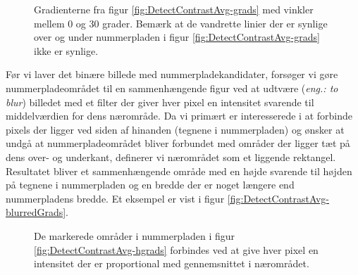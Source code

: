 \begin{figure}[htp]
  \centering
  \caption{Gradienterne fra figur \vref{fig:DetectContrastAvg-grads} med vinkler mellem 0 og 30 grader. Bemærk at de vandrette linier der er synlige over og under nummerpladen i figur \ref{fig:DetectContrastAvg-grads} ikke er synlige.}
  \label{fig:DetectContrastAvg-hgrads}  
\end{figure}


Før vi laver det binære billede med nummerpladekandidater, forsøger vi gøre nummerpladeområdet til en sammenhængende figur ved at udtvære (\textit{eng.: to blur}) billedet med et filter der giver hver pixel en intensitet svarende til middelværdien for dens nærområde. Da vi primært er interesserede i at forbinde pixels der ligger ved siden af hinanden (tegnene i nummerpladen) og ønsker at undgå at nummerpladeområdet bliver forbundet med områder der ligger tæt på dens over- og underkant, definerer vi nærområdet som et liggende rektangel. Resultatet bliver et sammenhængende område med en højde svarende til højden på tegnene i nummerpladen og en bredde der er noget længere end nummerpladens bredde. Et eksempel er vist i figur \vref{fig:DetectContrastAvg-blurredGrads}. 

\begin{figure}[htp]
  \centering
  \caption{De markerede områder i nummerpladen i figur \vref{fig:DetectContrastAvg-hgrads} forbindes ved at give hver pixel en intensitet der er proportional med gennemsnittet i nærområdet.}
  \label{fig:DetectContrastAvg-blurredGrads}  
\end{figure}


